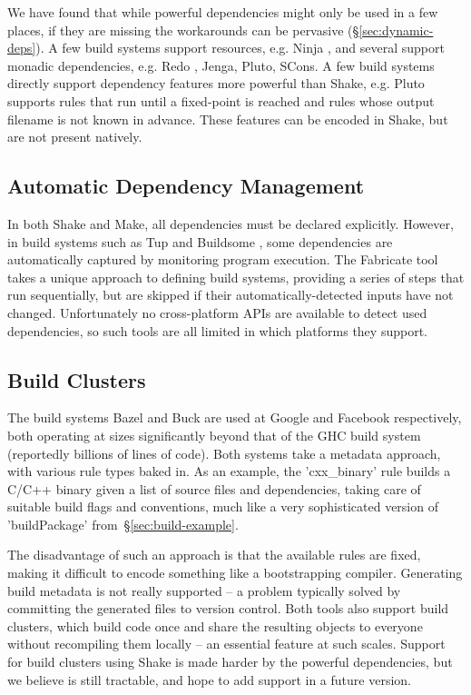 We have found that while powerful dependencies might only be used in a few
places, if they are missing the workarounds can be pervasive
(\S\ref{sec:dynamic-deps}). A few build systems support resources, e.g.
Ninja \cite{ninja}, and several support monadic dependencies, e.g. Redo
\cite{redo}, Jenga, Pluto, SCons. A few build systems directly support
dependency features more powerful than Shake, e.g. Pluto supports rules
that run until a fixed-point is reached and rules whose output filename is not known in
advance. These features can be encoded in Shake, but are not present natively.

\vspace{-0.5mm}
\subsection{Automatic Dependency Management}
\vspace{-0.5mm}

In both Shake and Make, all dependencies must be declared explicitly. However,
in build systems such as Tup \cite{tup} and Buildsome \cite{buildsome}, some
dependencies are automatically captured by monitoring program execution. The Fabricate tool \cite{fabricate} takes a unique approach
to defining build systems, providing a series of steps that run sequentially,
but are skipped if their automatically-detected inputs have not changed.
Unfortunately no cross-platform APIs are available to detect used dependencies,
so such tools are all limited in which platforms they support.

\vspace{-0.5mm}
\subsection{Build Clusters}
\vspace{-0.5mm}

The build systems Bazel and Buck \cite{buck} are used at Google and Facebook
respectively, both operating at sizes significantly beyond that of the GHC build
system (reportedly billions of lines of code). Both systems take a metadata
approach, with various rule types baked in. As an example, the \lst'cxx_binary'
rule builds a C/C++ binary given a list of source files and dependencies,
taking care of suitable build flags and conventions, much like a very sophisticated
version of \lst'buildPackage' from~\S\ref{sec:build-example}.

The disadvantage of such an approach is that the available rules are fixed,
making it difficult to encode something like a bootstrapping compiler.
Generating build metadata is not really supported -- a problem typically solved by
committing the generated files to version control. Both tools also support build
clusters, which build code once and share the resulting objects to everyone
without recompiling them locally -- an essential feature at such scales.
Support for build clusters using Shake is made harder by the powerful dependencies,
but we believe is still tractable, and hope to add support in a future version.

